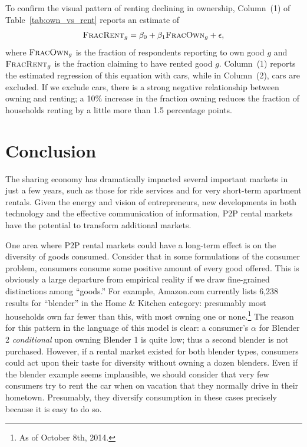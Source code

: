 \documentclass[11pt]{article}
\begin{document}
To confirm the visual pattern of renting declining in ownership, Column~(1) of Table~\ref{tab:own_vs_rent} reports an estimate of 
\begin{align}
\textsc{FracRent}_g = \beta_0 + \beta_1 \textsc{FracOwn}_g + \epsilon,  
\end{align} 
where $\textsc{FracOwn}_g$ is the fraction of respondents reporting to own good $g$ and $\textsc{FracRent}_g$ is the fraction claiming to have rented good $g$.
Column~(1) reports the estimated regression of this equation with cars, while in Column~(2), cars are excluded.
If we exclude cars, there is a strong negative relationship between owning and renting;
a 10\% increase in the fraction owning reduces the fraction of households renting by a little more than 1.5 percentage points. 

\section{Conclusion} 

The sharing economy has dramatically impacted several important markets in just a few years, such as those for ride services and for very short-term apartment rentals.
Given the energy and vision of entrepreneurs, new developments in both technology and the effective communication of information, P2P rental markets have the potential to transform additional markets.

One area where P2P rental markets could have a long-term effect is on the diversity of goods consumed. 
Consider that in some formulations of the consumer problem, consumers consume some positive amount of every good offered.
This is obviously a large departure from empirical reality if we draw fine-grained distinctions among ``goods.'' 
For example, Amazon.com currently lists 6,238 results for ``blender'' in the Home \& Kitchen category: 
presumably most households own far fewer than this, with most owning one or none.\footnote{As of October 8th, 2014.}
The reason for this pattern in the language of this model is clear: 
a consumer's $\alpha$ for Blender 2 \emph{conditional} upon owning Blender 1 is quite low;
thus a second blender is not purchased.
However, if a rental market existed for both blender types, consumers could act upon their taste for diversity without owning a dozen blenders. 
Even if the blender example seems implausible, we should consider that very few consumers try to rent the car when on vacation that they normally drive in their hometown. 
Presumably, they diversify consumption in these cases precisely because it is easy to do so. 
\end{document}

